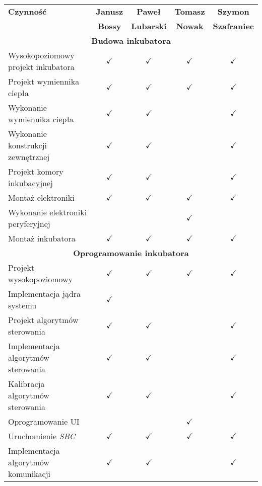 \begin{table}[b]
	\centering
	\begin{tabular}{|m{6cm}|c|c|c|c|}\hline
		\bfseries Czynność & \bfseries Janusz & \bfseries Paweł & \bfseries Tomasz &
		\bfseries Szymon \\
		& \bfseries Bossy & \bfseries Lubarski & \bfseries Nowak & \bfseries
		Szafraniec \\\hline
		\multicolumn{5}{|c|}{\bfseries Budowa inkubatora} \\\hline
		Wysokopoziomowy projekt inkubatora & $\checkmark$ & $\checkmark$ &
		$\checkmark$ & $\checkmark$ \\\hline
		Projekt wymiennika ciepła & $\checkmark$ & $\checkmark$ & $\checkmark$ &
		$\checkmark$ \\\hline
		Wykonanie wymiennika ciepła & $\checkmark$ & $\checkmark$ & & $\checkmark$
		\\\hline
		Wykonanie konstrukcji zewnętrznej & $\checkmark$ & $\checkmark$ & &
		$\checkmark$ \\\hline
		Projekt komory inkubacyjnej & $\checkmark$ & $\checkmark$ & & $\checkmark$
		\\\hline
		Montaż elektroniki & $\checkmark$ & $\checkmark$ & $\checkmark$ &
		$\checkmark$ \\\hline 
		Wykonanie elektroniki peryferyjnej & & & $\checkmark$ & \\\hline
		Montaż inkubatora & $\checkmark$ & $\checkmark$ & $\checkmark$ &
		$\checkmark$ \\\hline 
		\multicolumn{5}{|c|}{\bfseries Oprogramowanie inkubatora} \\\hline
		Projekt wysokopoziomowy & $\checkmark$ & $\checkmark$ & $\checkmark$ &
		$\checkmark$ \\\hline 
		Implementacja jądra systemu & $\checkmark$ & & & \\\hline
		Projekt algorytmów sterowania & $\checkmark$ & $\checkmark$ & & $\checkmark$
		\\\hline
		Implementacja algorytmów sterowania & $\checkmark$ & $\checkmark$ & &
		$\checkmark$ \\\hline
		Kalibracja algorytmów sterowania & $\checkmark$ & $\checkmark$ & &
		$\checkmark$ \\\hline
		Oprogramowanie UI & & & $\checkmark$ & \\\hline
		Uruchomienie \emph{SBC} & $\checkmark$ & $\checkmark$ & $\checkmark$ &
		$\checkmark$ \\\hline
		Implementacja algorytmów komunikacji & $\checkmark$ & $\checkmark$ & & $\checkmark$

\end{tabular}
\end{table}
